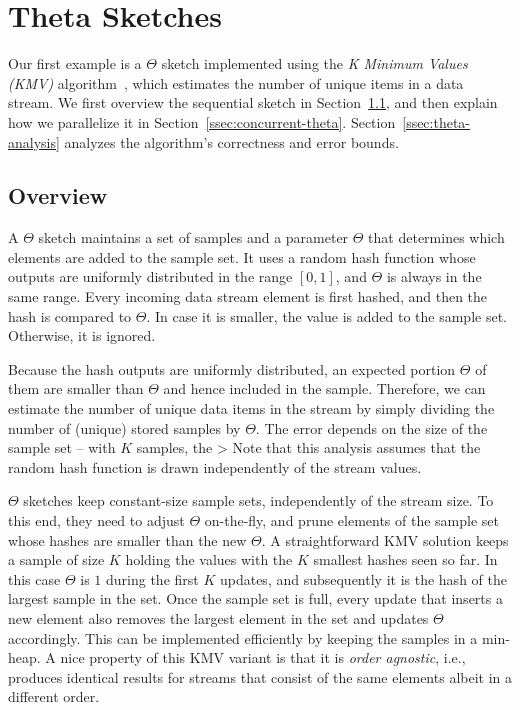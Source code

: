 \section{Theta Sketches}
\label{sec:theta}

Our first example is a $\Theta$ sketch implemented using  the 
\emph{K Minimum Values  (KMV)} algorithm~\cite{KMV}, 
which estimates the number of unique items in a data stream. 
We first overview the sequential  sketch in Section~\ref{ssec:theta-overview}, 
and then explain how we parallelize it in Section~\ref{ssec:concurrent-theta}.
Section~\ref{ssec:theta-analysis} analyzes the algorithm's correctness and error bounds.

\subsection{Overview}
\label{ssec:theta-overview}


A $\Theta$ sketch maintains a set of samples and a parameter $\Theta$
that determines which elements are added to the sample set. 
It uses a random hash function whose outputs are uniformly distributed
in the range $[0,1]$, and $\Theta$ is always in the same range.  
Every incoming data stream element is first hashed, and then the hash is compared to $\Theta$. 
In case it is smaller, the value is added to the sample set.  Otherwise, it is ignored. 

Because the hash outputs are uniformly distributed, an expected
portion $\Theta$ of them are smaller than $\Theta$ and hence included in the sample. 
Therefore, we can estimate the number of unique data items in the stream by
simply dividing the number of (unique) stored samples by $\Theta$.
The error depends on the size of the sample set -- with $K$ samples, 
the  >
Note that 
this analysis assumes that the random hash function is drawn independently of the stream values.

 $\Theta$ sketches keep constant-size sample sets, independently of the stream size. 
 To this end, they need to adjust $\Theta$ on-the-fly, and prune elements of 
 the sample set whose hashes are smaller than the new $\Theta$.
A straightforward KMV solution keeps a sample of size $K$ 
holding the  values with the $K$ smallest hashes seen so far. 
In this case $\Theta$ is $1$ during the first $K$ updates, and 
subsequently it is the hash of the largest sample in the set.
Once the sample set is full,
every update that inserts  a new element also removes the largest
element in the set and updates $\Theta$ accordingly. 
This can be implemented efficiently by keeping the samples in  a min-heap. 
A nice property of this KMV variant is that it is \emph{order agnostic}, i.e., produces 
identical results for streams that consist of the same elements albeit in a different order.

